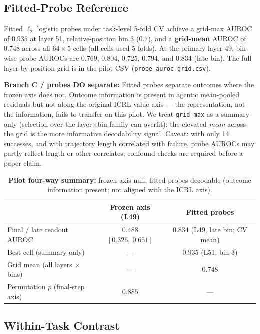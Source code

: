 \documentclass{article}
\begin{document}
\subsection{Fitted-Probe Reference}
\label{sec:results-probes}

Fitted $\ell_2$ logistic probes under task-level 5-fold CV achieve a grid-max AUROC of $0.935$ at layer 51, relative-position bin 3 ($0.7$), and a \textbf{grid-mean} AUROC of $0.748$ across all $64{\times}5$ cells (all cells used 5 folds).
At the primary layer 49, bin-wise probe AUROCs are $0.769$, $0.804$, $0.725$, $0.794$, and $0.834$ (late bin).
The full layer-by-position grid is in the pilot CSV (\texttt{probe\_auroc\_grid.csv}).

\textbf{Branch C / probes DO separate:}
Fitted probes separate outcomes where the frozen axis does not.
Outcome information is present in agentic mean-pooled residuals but not along the original ICRL value axis --- the representation, not the information, fails to transfer on this pilot.
We treat \texttt{grid\_max} as a summary only (selection over the layer$\times$bin family can overfit); the elevated \emph{mean} across the grid is the more informative decodability signal.
Caveat: with only 14 successes, and with trajectory length correlated with failure, probe AUROCs may partly reflect length or other correlates; confound checks are required before a paper claim.

\begin{table}[ht]
  \centering
  \begin{tabular}{lcc}
    \toprule
     & Frozen axis (L49) & Fitted probes \\
    \midrule
    Final / late readout AUROC
      & $0.488$ $[0.326,\ 0.651]$
      & $0.834$ (L49, late bin; CV mean) \\
    Best cell (summary only)
      & ---
      & $0.935$ (L51, bin 3) \\
    Grid mean (all layers $\times$ bins)
      & ---
      & $0.748$ \\
    Permutation $p$ (final-step axis)
      & $0.885$
      & --- \\
    \bottomrule
  \end{tabular}
  \caption{\textbf{Pilot four-way summary:} frozen axis null, fitted probes decodable
  (outcome information present; not aligned with the ICRL axis).}
  \label{tab:frozen_vs_fitted_pilot}
\end{table}

\subsection{Within-Task Contrast}
\label{sec:results-within}
\end{document}
